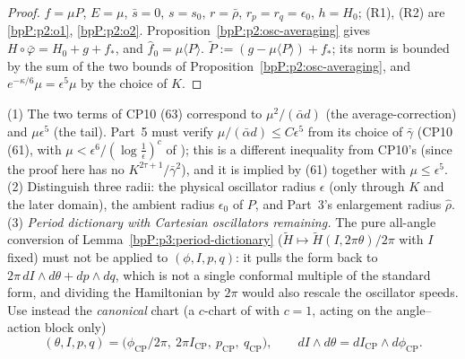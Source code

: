 \begin{proof}
\label{stepP:p2:ar-apply} $f=\mu P$, $E=\mu$, $\bar s=0$, $s=s_0$, $r=\bar\rho$, $r_p=r_q=\epsilon_0$, $h=H_0$; (R1), (R2) are \ref{bpP:p2:o1}, \ref{bpP:p2:o2}. Proposition~\ref{bpP:p2:osc-averaging} gives $H\circ\bar\varphi=H_0+g+f_*$, and $\hat f_0=\mu\langle P\rangle$.
\label{stepP:p2:ar-collect} $\widetilde P:=(g-\mu\langle P\rangle)+f_*$; its norm is bounded by the sum of the two bounds of Proposition~\ref{bpP:p2:osc-averaging}, and $e^{-\kappa/6}\mu=\epsilon^5\mu$ by the choice of $K$.
\end{proof}

\begin{remark}\label{bpP:p2:use5}
(1) The two terms of CP10 (63) correspond to $\mu^2/(\bar\alpha d)$ (the average-correction) and $\mu\epsilon^5$ (the tail). Part~5 must verify $\mu/(\bar\alpha d)\le C\epsilon^5$ from its choice of $\bar\gamma$ (CP10 (61), with $\mu<\epsilon^6/(\log\frac1\epsilon)^{c}$ of ); this is a different inequality from CP10's (since the proof here has no $K^{2\tau+1}/\bar\gamma^2$), and it is implied by (61) together with $\mu\le\epsilon^5$.
(2) Distinguish three radii: the physical oscillator radius $\epsilon$ (only through $K$ and the later domain), the ambient radius $\epsilon_0$ of $P$, and Part~3's enlargement radius $\hat\rho$.
(3) \emph{Period dictionary with Cartesian oscillators remaining.} The pure all-angle conversion of Lemma~\ref{bpP:p3:period-dictionary} ($\tilde H\mapsto\tilde H(I,2\pi\theta)/2\pi$ with $I$ fixed) must not be applied to $(\phi,I,p,q)$: it pulls the form back to $2\pi\,dI\wedge d\theta+dp\wedge dq$, which is not a single conformal multiple of the standard form, and dividing the Hamiltonian by $2\pi$ would also rescale the oscillator speeds. Use instead the \emph{canonical} chart (a $c$-chart of  with $c=1$, acting on the angle--action block only)
\[(\theta,I,p,q)=\bigl(\phi_{\mathrm{CP}}/2\pi,\ 2\pi I_{\mathrm{CP}},\ p_{\mathrm{CP}},\ q_{\mathrm{CP}}\bigr),\qquad dI\wedge d\theta=dI_{\mathrm{CP}}\wedge d\phi_{\mathrm{CP}}.\]

\end{remark}
